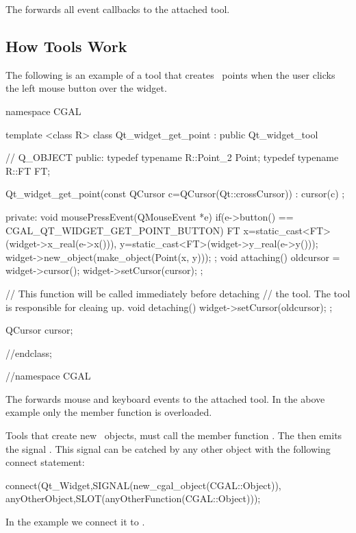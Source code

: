The  forwards all event callbacks to the attached tool.


\subsection{How Tools Work}

The following is an example of a tool that creates \cgal\ points when the user 
clicks the left mouse button over the widget. 
 
\begin{ccExampleCode}
namespace CGAL {

template <class R>
class Qt_widget_get_point : public Qt_widget_tool
{
  //  Q_OBJECT
public:
  typedef typename R::Point_2	Point;
  typedef typename R::FT	FT;
  
  Qt_widget_get_point(const QCursor c=QCursor(Qt::crossCursor)) :
    cursor(c) {};
  
private:
  void mousePressEvent(QMouseEvent *e)
  {
    if(e->button() == CGAL_QT_WIDGET_GET_POINT_BUTTON)
    {
      FT
        x=static_cast<FT>(widget->x_real(e->x())),
        y=static_cast<FT>(widget->y_real(e->y()));
      widget->new_object(make_object(Point(x, y)));
    }
  };
  void attaching()
  {
    oldcursor = widget->cursor();
    widget->setCursor(cursor);
  };
  
  // This function will be called immediately before detaching
  // the tool. The tool is responsible for cleaing up.
  void detaching()
  {
    widget->setCursor(oldcursor);
  };

  QCursor cursor;
}//endclass;
}//namespace CGAL
\end{ccExampleCode}

The  forwards mouse and keyboard events to the attached tool.
In the above example only the  member function is overloaded.

Tools that create new \cgal\ objects, must call the member 
function . The  
then emits the signal . This signal can be 
catched by any other object with the following connect statement:

\begin{ccExampleCode}
connect(Qt_Widget,SIGNAL(new_cgal_object(CGAL::Object)),
        anyOtherObject,SLOT(anyOtherFunction(CGAL::Object)));
\end{ccExampleCode}

In the example we connect it to .


